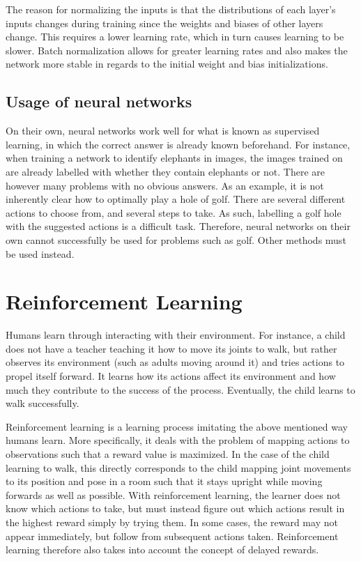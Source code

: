 \documentclass{kththesis}
\begin{document}
The reason for normalizing the inputs is that the distributions of each layer's inputs changes during training since the weights and biases of other layers change. This requires a lower learning rate, which in turn causes learning to be slower. Batch normalization allows for greater learning rates and also makes the network more stable in regards to the initial weight and bias initializations. \parencite{ioffe2015batch}

\subsection{Usage of neural networks}
On their own, neural networks work well for what is known as supervised learning, in which the correct answer is already known beforehand. For instance, when training a network to identify elephants in images, the images trained on are already labelled with whether they contain elephants or not. There are however many problems with no obvious answers. As an example, it is not inherently clear how to optimally play a hole of golf. There are several different actions to choose from, and several steps to take. As such, labelling a golf hole with the suggested actions is a difficult task. Therefore, neural networks on their own cannot successfully be used for problems such as golf. Other methods must be used instead.

\section{Reinforcement Learning}
\label{sec:reinforcementlearning}
Humans learn through interacting with their environment. For instance, a child does not have a teacher teaching it how to move its joints to walk, but rather observes its environment (such as adults moving around it) and tries actions to propel itself forward. It learns how its actions affect its environment and how much they contribute to the success of the process. Eventually, the child learns to walk successfully. 

Reinforcement learning is a learning process imitating the above mentioned way humans learn. More specifically, it deals with the problem of mapping actions to observations such that a reward value is maximized. In the case of the child learning to walk, this directly corresponds to the child mapping joint movements to its position and pose in a room such that it stays upright while moving forwards as well as possible. With reinforcement learning, the learner does not know which actions to take, but must instead figure out which actions result in the highest reward simply by trying them. In some cases, the reward may not appear immediately, but follow from subsequent actions taken. Reinforcement learning therefore also takes into account the concept of delayed rewards. \parencite{sutton1998introduction}
\end{document}
